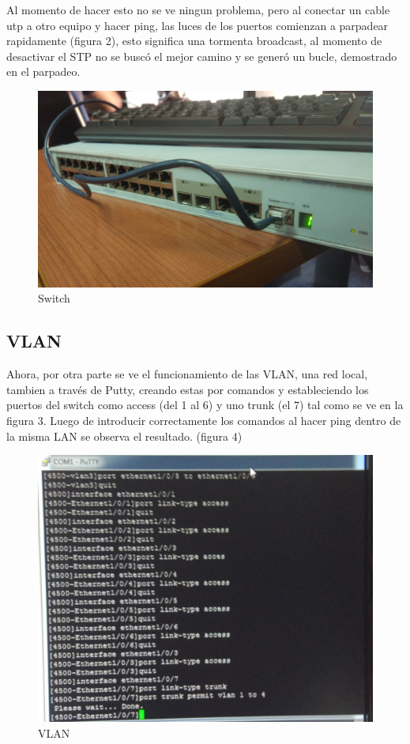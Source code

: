 \documentclass{article}
\begin{document}
Al momento de hacer esto no se ve ningun problema, pero al conectar un cable utp a otro equipo y hacer ping, las luces de los puertos comienzan a parpadear rapidamente (figura 2), esto significa una tormenta broadcast, al momento de desactivar el STP no se buscó el mejor camino y se generó un bucle, demostrado en el parpadeo.

\begin{figure}[h!]
\centering
\includegraphics[scale=0.08]{IMG2}
\caption{Switch}
\end{figure}

\subsection{VLAN}

Ahora, por otra parte se ve el funcionamiento de las VLAN, una red local, tambien a través de Putty, creando estas por comandos y estableciendo los puertos del switch como access (del 1 al 6) y uno trunk (el 7) tal como se ve en la figura 3. Luego de introducir correctamente los comandos al hacer ping dentro de la misma LAN se observa el resultado. (figura 4)

\begin{figure}[h!]
\centering
\includegraphics[scale=0.08]{IMG3}
\caption{VLAN}
\end{figure}
\end{document}
